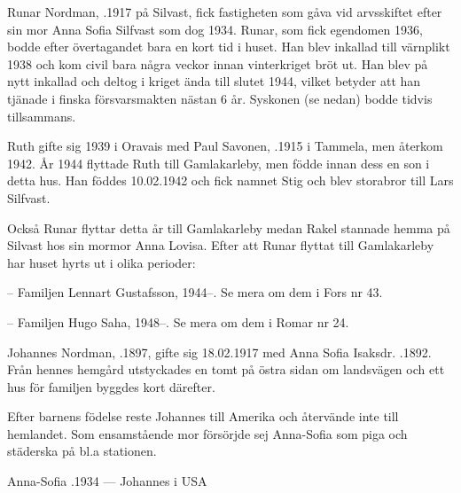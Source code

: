 Runar Nordman, .1917 på Silvast, fick fastigheten som gåva vid arvsskiftet efter sin mor Anna Sofia Silfvast som dog 1934. Runar, som fick egendomen 1936, bodde efter övertagandet bara en kort tid i huset. Han blev inkallad till värnplikt 1938 och kom civil bara några veckor innan vinterkriget bröt ut. Han blev på nytt inkallad och deltog i kriget ända till slutet 1944, vilket betyder att han tjänade i finska försvarsmakten nästan 6 år. Syskonen (se nedan) bodde tidvis tillsammans.

Ruth gifte sig 1939 i Oravais med  Paul Savonen, .1915 i Tammela, men återkom 1942. År 1944 flyttade Ruth till Gamlakarleby, men födde innan dess en son i detta hus. Han föddes 10.02.1942 och fick namnet Stig och blev storabror till Lars Silfvast.

Också Runar flyttar detta år till Gamlakarleby medan Rakel stannade hemma på Silvast hos sin mormor Anna Lovisa. Efter att Runar flyttat till Gamlakarleby har huset hyrts ut i olika perioder:

-- Familjen Lennart Gustafsson, 1944--. Se mera om dem i Fors nr 43.

-- Familjen Hugo Saha, 1948--. Se mera om dem i Romar nr 24.


Johannes Nordman, .1897, gifte sig 18.02.1917 med Anna Sofia Isaksdr. .1892. Från hennes hemgård utstyckades en tomt på östra sidan om landsvägen och ett hus för familjen byggdes kort därefter.

Efter barnens födelse reste Johannes till Amerika och återvände inte till hemlandet. Som ensamstående mor försörjde sej Anna-Sofia som piga och städerska på bl.a stationen.
\begin{jhchildren}
  \item {}
  \item {}
  \item {}
\end{jhchildren}

Anna-Sofia .1934  ---  Johannes   i USA




